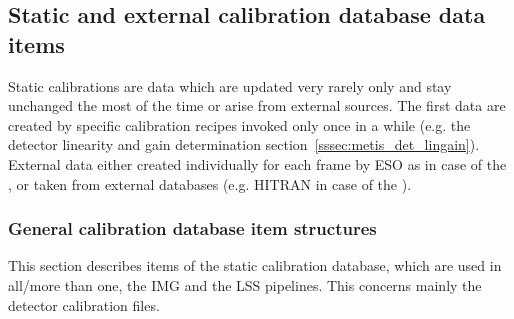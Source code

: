 
\subsection{Static and external calibration database data items}\label{ssec:caldb_items_structures}
Static calibrations are data which are updated very rarely only and stay unchanged the most of the time or arise from external sources. The first data are created by specific calibration recipes invoked only once in a while (e.g. the detector linearity and gain determination section~\ref{sssec:metis_det_lingain}). External data either created individually for each frame by \ac{ESO} as in case of the , or taken from external databases (e.g. \ac{HITRAN} in case of the ).

\subsubsection{General calibration database item structures}\label{sssec:generalcaldbdatastructs}
This section describes items of the static calibration database, which are used in all/more than one, the \ac{IMG} and the \ac{LSS} pipelines. This concerns mainly the detector calibration files.

